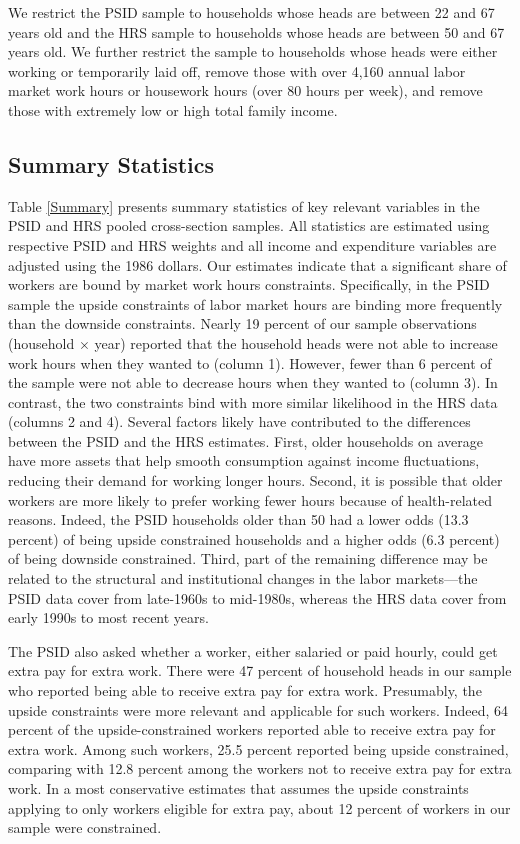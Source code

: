We restrict the PSID sample to households whose heads are between 22 and 67 years old and the HRS sample to households whose heads are between 50 and 67 years old. We further restrict the sample to households whose heads were either working or temporarily laid off, remove those with over 4,160 annual labor market work hours or housework hours (over 80 hours per week), and remove those with extremely low or high total family income.

\subsection{Summary Statistics}

Table \ref{Summary} presents summary statistics of key relevant variables in the PSID and HRS pooled cross-section samples. All statistics are estimated using respective PSID and HRS weights and all income and expenditure variables are adjusted using the 1986 dollars. Our estimates indicate that a significant share of workers are bound by market work hours constraints. Specifically, in the PSID sample the upside constraints of labor market hours are binding more frequently than the downside constraints. Nearly 19 percent of our sample observations (household $\times$ year) reported that the household heads were not able to increase work hours when they wanted to (column 1). However, fewer than 6 percent of the sample were not able to decrease hours when they wanted to (column 3). In contrast, the two constraints bind with more similar likelihood in the HRS data (columns 2 and 4). Several factors likely have contributed to the differences between the PSID and the HRS estimates. First, older households on average have more assets that help smooth consumption against income fluctuations, reducing their demand for working longer hours. Second, it is possible that older workers are more likely to prefer working fewer hours because of health-related reasons. Indeed, the PSID households older than 50 had a lower odds (13.3 percent) of being upside constrained households and a higher odds (6.3 percent) of being downside constrained.  Third, part of the remaining difference may be related to the structural and institutional changes in the labor markets---the PSID data cover from late-1960s to mid-1980s, whereas the HRS data cover from early 1990s to most recent years.

The PSID also asked whether a worker, either salaried or paid hourly, could get extra pay for extra work.  There were 47 percent of household heads in our sample who reported being able to receive extra pay for extra work.  Presumably, the upside constraints were more relevant and applicable for such workers. Indeed, 64 percent of the upside-constrained workers reported able to receive extra pay for extra work. Among such workers, 25.5 percent reported being upside constrained, comparing with 12.8 percent among the workers not to receive extra pay for extra work.  In a most conservative estimates that assumes the upside constraints applying to only workers eligible for extra pay, about 12 percent of workers in our sample were constrained.

